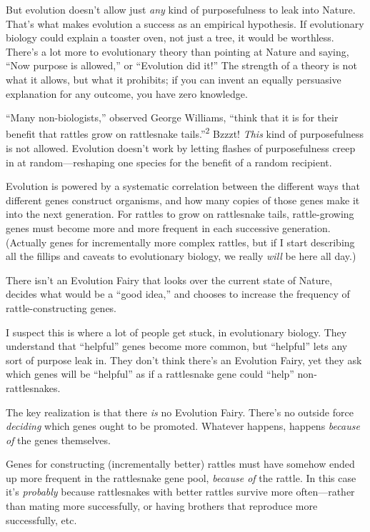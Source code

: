 {
 But evolution doesn't allow just \textit{any} kind
of purposefulness to leak into Nature. That's what
makes evolution a success as an empirical hypothesis. If evolutionary
biology could explain a toaster oven, not just a tree, it would be
worthless. There's a lot more to evolutionary theory
than pointing at Nature and saying, ``Now purpose is
allowed,'' or ``Evolution did
it!'' The strength of a theory is not what it allows,
but what it prohibits; if you can invent an equally persuasive
explanation for any outcome, you have zero knowledge.}

{
 ``Many non-biologists,''
observed George Williams, ``think that it is for their
benefit that rattles grow on rattlesnake
tails.''\textsuperscript{2} Bzzzt! \textit{This} kind
of purposefulness is not allowed. Evolution doesn't
work by letting flashes of purposefulness creep in at
random---reshaping one species for the benefit of a random recipient.}

{
 Evolution is powered by a systematic correlation between the
different ways that different genes construct organisms, and how many
copies of those genes make it into the next generation. For rattles to
grow on rattlesnake tails, rattle-growing genes must become more and
more frequent in each successive generation. (Actually genes for
incrementally more complex rattles, but if I start describing all the
fillips and caveats to evolutionary biology, we really \textit{will} be
here all day.)}

{
 There isn't an Evolution Fairy that looks over the
current state of Nature, decides what would be a
``good idea,'' and chooses to
increase the frequency of rattle-constructing genes.}

{
 I suspect this is where a lot of people get stuck, in evolutionary
biology. They understand that
``helpful'' genes become more
common, but ``helpful'' lets any
sort of purpose leak in. They don't think
there's an Evolution Fairy, yet they ask which genes
will be ``helpful'' as if a
rattlesnake gene could ``help''
non-rattlesnakes.}

{
 The key realization is that there \textit{is} no Evolution Fairy.
There's no outside force \textit{deciding} which genes
ought to be promoted. Whatever happens, happens \textit{because of} the
genes themselves.}

{
 Genes for constructing (incrementally better) rattles must have
somehow ended up more frequent in the rattlesnake gene pool,
\textit{because of} the rattle. In this case it's
\textit{probably} because rattlesnakes with better rattles survive more
often---rather than mating more successfully, or having brothers that
reproduce more successfully, etc.}

